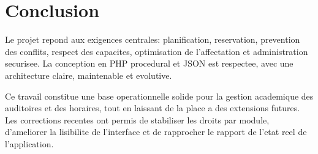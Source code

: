 \documentclass[12pt,a4paper]{article}
\begin{document}
\section{Conclusion}
Le projet repond aux exigences centrales: planification, reservation, prevention des conflits, respect des capacites, optimisation de l'affectation et administration securisee.
La conception en PHP procedural et JSON est respectee, avec une architecture claire, maintenable et evolutive.

Ce travail constitue une base operationnelle solide pour la gestion academique des auditoires et des horaires, tout en laissant de la place a des extensions futures.
Les corrections recentes ont permis de stabiliser les droits par module, d'ameliorer la lisibilite de l'interface et de rapprocher le rapport de l'etat reel de l'application.
\end{document}
